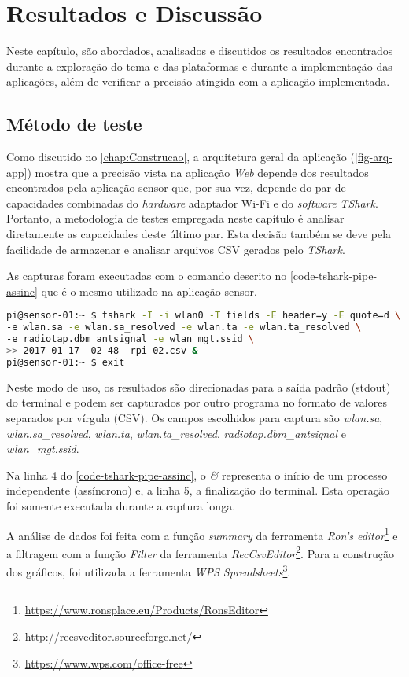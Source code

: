 \chapter{Resultados e Discussão}
\label{chap:resultados}

Neste capítulo, são abordados, analisados e discutidos os resultados encontrados
durante a exploração do tema e das plataformas e durante a implementação das
aplicações, além de verificar a precisão atingida com a aplicação implementada.


\section{Método de teste}
\label{sec:metodo-teste}

Como discutido no \autoref{chap:Construcao}, a arquitetura geral da aplicação (\autoref{fig-arq-app})
mostra que a precisão vista na aplicação \emph{Web} depende dos resultados
encontrados pela aplicação sensor que, por sua vez, depende do par de
capacidades combinadas do \emph{hardware} adaptador Wi-Fi e do \emph{software}
\emph{TShark}. Portanto, a metodologia de testes empregada neste capítulo é
analisar diretamente as capacidades deste último par. Esta decisão também se
deve pela facilidade de armazenar e analisar arquivos CSV gerados pelo
\emph{TShark}.

As capturas foram executadas com o comando descrito no \autoref{code-tshark-pipe-assinc}
que é o mesmo utilizado na aplicação sensor.

\begin{lstlisting}[language=bash,caption={TShark e redirecionamento da saída para arquivo assíncrono},label=code-tshark-pipe-assinc]
pi@sensor-01:~ $ tshark -I -i wlan0 -T fields -E header=y -E quote=d \
-e wlan.sa -e wlan.sa_resolved -e wlan.ta -e wlan.ta_resolved \
-e radiotap.dbm_antsignal -e wlan_mgt.ssid \
>> 2017-01-17--02-48--rpi-02.csv &
pi@sensor-01:~ $ exit
\end{lstlisting}

Neste modo de uso, os resultados são direcionadas para a saída padrão
(stdout)  do terminal e podem ser capturados por outro programa no formato
de valores separados por vírgula (CSV). Os campos escolhidos para captura
são \emph{wlan.sa}, \emph{wlan.sa\_resolved}, \emph{wlan.ta},
\emph{wlan.ta\_resolved}, \emph{radiotap.dbm\_antsignal} e \emph{wlan\_mgt.ssid}.

Na linha 4 do \autoref{code-tshark-pipe-assinc}, o \emph{\&} representa o início
de um processo independente (assíncrono) e, a linha 5, a finalização do terminal.
Esta operação foi somente executada durante a captura longa.

A análise de dados foi feita com a função \emph{summary} da ferramenta
\emph{Ron’s editor}\footnote{\url{https://www.ronsplace.eu/Products/RonsEditor}}
e a filtragem com a função \emph{Filter} da ferramenta
\emph{RecCsvEditor}\footnote{\url{http://recsveditor.sourceforge.net/}}. Para a
construção dos gráficos, foi utilizada a ferramenta
\emph{WPS Spreadsheets}\footnote{\url{https://www.wps.com/office-free}}.

